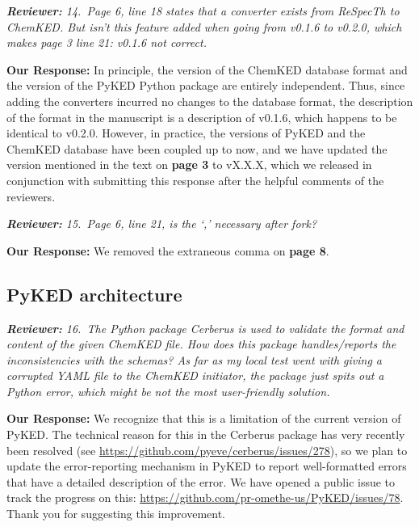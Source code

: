 \documentclass[a4paper,10pt]{elsarticle}
\newenvironment{reviewer}{\vspace{0.5\baselineskip}\begingroup\itshape\textbf{Reviewer:}}{\endgroup}
\newenvironment{response}{\textbf{Our Response:}}{\vspace{0.5\baselineskip}}
\begin{document}
\begin{reviewer}
    14.~Page 6, line 18 states that a converter exists from ReSpecTh to ChemKED. But isn't this
    feature added when going from v0.1.6 to v0.2.0, which makes page 3 line 21: v0.1.6 not correct.
\end{reviewer}

\begin{response}
    In principle, the version of the ChemKED database format and the version of the PyKED Python
    package are entirely independent. Thus, since adding the converters incurred no changes to the
    database format, the description of the format in the manuscript is a description of v0.1.6,
    which happens to be identical to v0.2.0. However, in practice, the versions of PyKED and the
    ChemKED database have been coupled up to now, and we have updated the version mentioned in the
    text on \textbf{page 3} to vX.X.X, which we released in conjunction with submitting
    this response after the helpful comments of the reviewers.
\end{response}

\begin{reviewer}
    15.~Page 6, line 21, is the `,' necessary after fork?
\end{reviewer}

\begin{response}
    We removed the extraneous comma on \textbf{page 8}.
\end{response}

\subsection*{PyKED architecture}

\begin{reviewer}
    16.~The Python package Cerberus is used to validate the format and content of the given ChemKED
    file. How does this package handles/reports the inconsistencies with the schemas? As far as my
    local test went with giving a corrupted YAML file to the ChemKED initiator, the package just
    spits out a Python error, which might be not the most user-friendly solution.
\end{reviewer}

\begin{response}
    We recognize that this is a limitation of the current version of PyKED. The technical reason for
    this in the Cerberus package has very recently been resolved (see
    \url{https://github.com/pyeve/cerberus/issues/278}), so we plan to update the error-reporting
    mechanism in PyKED to report well-formatted errors that have a detailed description of the
    error. We have opened a public issue to track the progress on this:
    \url{https://github.com/pr-omethe-us/PyKED/issues/78}. Thank you for suggesting this
    improvement.
\end{response}
\end{document}
